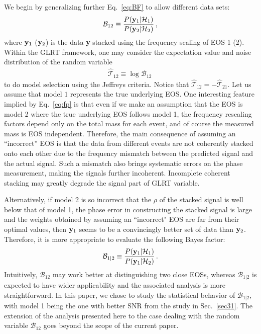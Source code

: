 \documentclass[prd,aps,floatfix,superscriptaddress,nofootinbib,twocolumn,10pt,English]{revtex4-1}
\begin{document}
We begin by generalizing further 
Eq.~\eqref{eq:BF} to allow different data sets:
\begin{align}\label{eqodd2}
\mathcal B_{12} \equiv \frac{P({\bf y}_1| \mathcal{H}_1)}{P({\bf y}_2| \mathcal{H}_2)}\,,
\end{align}
where ${\bf y}_1$ (${\bf y}_2$) is the data {\bf y} stacked using the
frequency scaling of EOS 1 (2).  Within the GLRT framework, one may
consider the expectation value and noise distribution of the random
variable
\begin{align}
\hat{\mathcal T}_{12} \equiv \log \mathcal B_{12}\,
\end{align}
to do model selection using the Jeffreys criteria. Notice that $\hat{\mathcal T}_{12} =-\hat{\mathcal T}_{21}$.  
Let us assume that model $1$ represents the true underlying EOS.  One
interesting feature implied by Eq.~\eqref{eq:fp} is that even if we
make an assumption that the EOS is model 2 where the true underlying
EOS follows model 1, the frequency rescaling factors depend only on
the total mass for each event, and of course the measured mass is EOS
independent.  Therefore, the main consequence of assuming an
``incorrect'' EOS is that the data from different events are not
coherently stacked onto each other due to the frequency mismatch
between the predicted signal and the actual signal.  Such a mismatch
also brings systematic errors on the phase measurement, making the
signals further incoherent. Incomplete coherent stacking may greatly
degrade the signal part of GLRT variable.


Alternatively, if model 2 is so incorrect that the $\rho$ of the
stacked signal is well below that of model 1, the phase
error in constructing the stacked signal is large and the weights
obtained by assuming an ``incorrect" EOS are far from their optimal
values, then ${\bf y}_1$ seems to be a convincingly better set of data than
${\bf y}_2$. Therefore, it is more appropriate to evaluate the following
Bayes factor:
\begin{align}\label{eqodd3}
\mathcal B_{1|2} \equiv \frac{P({\bf y}_1 | \mathcal{H}_1)}{P({\bf y}_1 | \mathcal{H}_2)}\,.
\end{align}
Intuitively, $\mathcal B_{12}$ may work better at distinguishing two
close EOSs, whereas $\mathcal B_{1|2}$ is expected to have wider
applicability and the associated analysis is more straightforward. In
this paper, we chose to study the statistical behavior of $\mathcal
B_{1|2}$, with model 1 being the one with better SNR from the
study in Sec.~\ref{sec31}. The extension of the analysis presented
here to the case dealing with the random variable $\mathcal B_{12}$
goes beyond the scope of the current paper.



\end{document}
